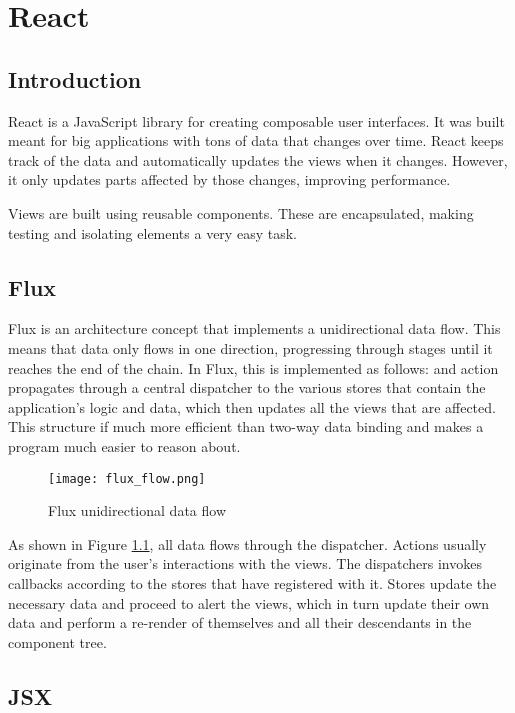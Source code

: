 \chapter{React}
\justifying
\section{Introduction}

React is a JavaScript library for creating composable user interfaces. It was built meant for big applications with tons of data that changes over time. React keeps track of the data and automatically updates the views when it changes. However, it only updates parts affected by those changes, improving performance.

Views are built using reusable components. These are encapsulated, making testing and isolating elements a very easy task.

\section{Flux}

Flux is an architecture concept that implements a unidirectional data flow. This means that data only flows in one direction, progressing through stages until it reaches the end of the chain. In Flux, this is implemented as follows: and  action propagates through a central dispatcher to the various stores that contain the application's logic and data, which then updates all the views that are affected. This structure if much more efficient than two-way data binding and makes a program much easier to reason about.

\begin{figure}[H]
	\centering
	\texttt{[image: flux\_flow.png]}
	\caption{Flux unidirectional data flow\label{fig:fluxflow}}
\end{figure}

As shown in Figure \ref{fig:fluxflow}, all data flows through the dispatcher. Actions usually originate from the user's interactions with the views. The dispatchers invokes callbacks according to the stores that have registered with it. Stores update the necessary data and proceed to alert the views, which in turn update their own data and perform a re-render of themselves and all their descendants in the component tree.

\section{JSX}


